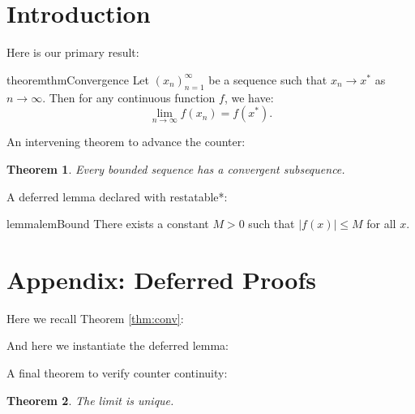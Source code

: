 \documentclass{article}
\newtheorem{theorem}{Theorem}
\begin{document}
\section{Introduction}

Here is our primary result:
\begin{restatable}{theorem}{thmConvergence}
\label{thm:conv}
Let $(x_n)_{n=1}^\infty$ be a sequence such that $x_n \to x^*$ as $n \to \infty$.
Then for any continuous function $f$, we have:
\begin{equation}\label{eq:limit}
\lim_{n \to \infty} f(x_n) = f(x^*).
\end{equation}
\end{restatable}

An intervening theorem to advance the counter:
\begin{theorem}
Every bounded sequence has a convergent subsequence.
\end{theorem}

A deferred lemma declared with restatable*:
\begin{restatable*}{lemma}{lemBound}
There exists a constant $M > 0$ such that $|f(x)| \le M$ for all $x$.
\end{restatable*}

\section{Appendix: Deferred Proofs}

Here we recall Theorem \ref{thm:conv}:
\thmConvergence*

And here we instantiate the deferred lemma:
\lemBound*

A final theorem to verify counter continuity:
\begin{theorem}
The limit is unique.
\end{theorem}
\end{document}
